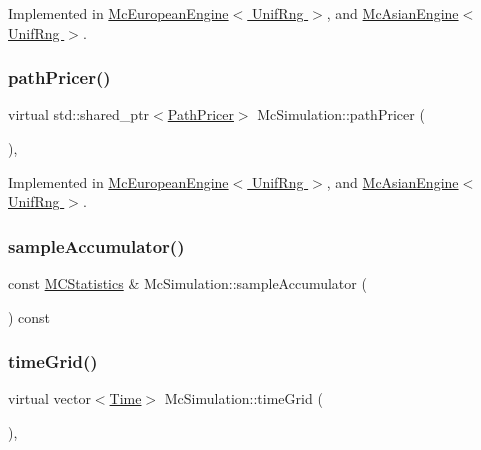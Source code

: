 Implemented in \hyperlink{class_mc_european_engine_ae2a93d63269eac42449f8b958ec15535}{Mc\+European\+Engine$<$ Unif\+Rng $>$}, and \hyperlink{class_mc_asian_engine_a93c9216b38bcbe0fe7e8131bf975dbc2}{Mc\+Asian\+Engine$<$ Unif\+Rng $>$}.

\hypertarget{class_mc_simulation_a3182a27c79d31cfb65e9a1a6b60f5391}{}\label{class_mc_simulation_a3182a27c79d31cfb65e9a1a6b60f5391} 
\subsubsection{\texorpdfstring{path\+Pricer()}{pathPricer()}}
{\footnotesize\ttfamily virtual std\+::shared\+\_\+ptr$<$\hyperlink{class_path_pricer}{Path\+Pricer}$>$ Mc\+Simulation\+::path\+Pricer (\begin{DoxyParamCaption}{ }\end{DoxyParamCaption})\hspace{0.3cm}{\ttfamily [private]}, {}}



Implemented in \hyperlink{class_mc_european_engine_a21dd3ee9970dd5bae2be03a723d0a290}{Mc\+European\+Engine$<$ Unif\+Rng $>$}, and \hyperlink{class_mc_asian_engine_afb903df1f8e0023a1f6bfae43ccbc8f7}{Mc\+Asian\+Engine$<$ Unif\+Rng $>$}.

\hypertarget{class_mc_simulation_af66197576bd23e26e91636f8ca1c7197}{}\label{class_mc_simulation_af66197576bd23e26e91636f8ca1c7197} 
\subsubsection{\texorpdfstring{sample\+Accumulator()}{sampleAccumulator()}}
{\footnotesize\ttfamily const \hyperlink{class_m_c_statistics}{M\+C\+Statistics} \& Mc\+Simulation\+::sample\+Accumulator (\begin{DoxyParamCaption}{ }\end{DoxyParamCaption}) const}

\hypertarget{class_mc_simulation_a71f4b6eedd90f057203a94467a691387}{}\label{class_mc_simulation_a71f4b6eedd90f057203a94467a691387} 
\subsubsection{\texorpdfstring{time\+Grid()}{timeGrid()}}
{\footnotesize\ttfamily virtual vector$<$\hyperlink{_name_def_8h_ac2d3e0ba793497bcca555c7c2cf64ff3}{Time}$>$ Mc\+Simulation\+::time\+Grid (\begin{DoxyParamCaption}{ }\end{DoxyParamCaption})\hspace{0.3cm}{\ttfamily [private]}, {}}



